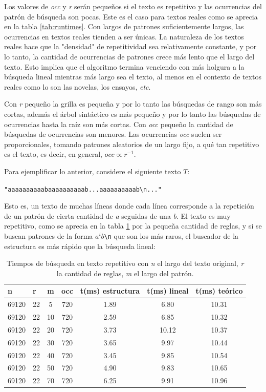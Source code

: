 Los valores de \textit{occ} y \textit{r} serán pequeños si el texto es repetitivo y las ocurrencias del patrón de búsqueda son pocas. Este es el caso para textos reales como se aprecia en la tabla \ref{tab:runtimes}. Con largos de patrones suficientemente largos, las ocurrencias en textos reales tienden a ser únicas. La naturaleza de los textos reales hace que la "densidad" de repetitividad sea relativamente constante, y por lo tanto, la cantidad de ocurrencias de patrones crece más lento que el largo del texto. Esto implica que el algoritmo termina venciendo con más holgura a la búsqueda lineal mientras más largo sea el texto, al menos en el contexto de textos reales como lo son las novelas, los ensayos, \textit{etc}.

Con \textit{r} pequeño la grilla es pequeña y por lo tanto las búsquedas de rango son más cortas, además el árbol sintáctico es más pequeño y por lo tanto las búsquedas de ocurrencias hasta la raíz son más cortas. Con \textit{occ} pequeño la cantidad de búsquedas de ocurrencias son menores. Las ocurrencias \textit{occ} suelen ser proporcionales, tomando patrones aleatorios de un largo fijo, a qué tan repetitivo es el texto, es decir, en general, $occ \propto r ^{-1}$.

Para ejemplificar lo anterior, considere el siguiente texto $T$: 

\verb|"aaaaaaaaaabaaaaaaaaaab...aaaaaaaaaab\n..."|

Esto es, un texto de muchas líneas donde cada línea corresponde a la repetición de un patrón de cierta cantidad de \textit{a} seguidas de una \textit{b}. El texto es muy repetitivo, como se aprecia en la tabla \ref{tab:runtimes2} por la pequeña cantidad de reglas, y si se buscan patrones de la forma $a^{i}b$\verb|\n| que son los más raros, el buscador de la estructura es más rápido que la búsqueda lineal:

\begin{table}[h!]
\centering
\begin{tabular}{|l|l|c|c|c|c|c|}
\hline
\textbf{n} & \textbf{r} & \textbf{m} & \textbf{occ} & \textbf{t(ms) estructura} & t(ms) lineal & t(ms) teórico \\ \hline
69120 & 22 & 5 & 720 & 1.89 & 6.80 & 10.31 \\
69120 & 22 & 10 & 720 & 2.59 & 6.85 & 10.32 \\
69120 & 22 & 20 & 720 & 3.73 & 10.12 & 10.37 \\
69120 & 22 & 30 & 720 & 3.65 & 9.97 & 10.44 \\
69120 & 22 & 40 & 720 & 3.45 & 9.85 & 10.54 \\
69120 & 22 & 50 & 720 & 4.90 & 9.83 & 10.65 \\
69120 & 22 & 70 & 720 & 6.25 & 9.91 & 10.96 \\  \hline

\end{tabular}
\caption{Tiempos de búsqueda en texto repetitivo con \textit{n} el largo del texto original, \textit{r} la cantidad de reglas, \textit{m} el largo del patrón. }
\label{tab:runtimes2}
\end{table}

